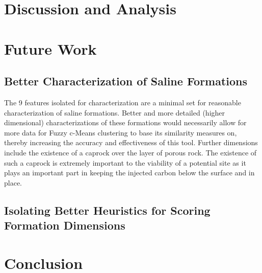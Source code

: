 \documentclass[a4paper, 12pt]{article}
\begin{document}



\section{Discussion and Analysis}

\section{Future Work}
\subsection{Better Characterization of Saline Formations}
The 9 features isolated for characterization are a minimal set for reasonable characterization of saline formations. Better and more detailed (higher dimensional) characterizations of these formations would necessarily allow for more data for Fuzzy c-Means clustering to base its similarity measures on, thereby increasing the accuracy and effectiveness of this tool. Further dimensions include the existence of a caprock over the layer of porous rock. The existence of such a caprock is extremely important to the viability of a potential site as it plays an important part in keeping the injected carbon below the surface and in place.  

\subsection{Isolating Better Heuristics for Scoring Formation Dimensions}
\section{Conclusion}
\end{document}
